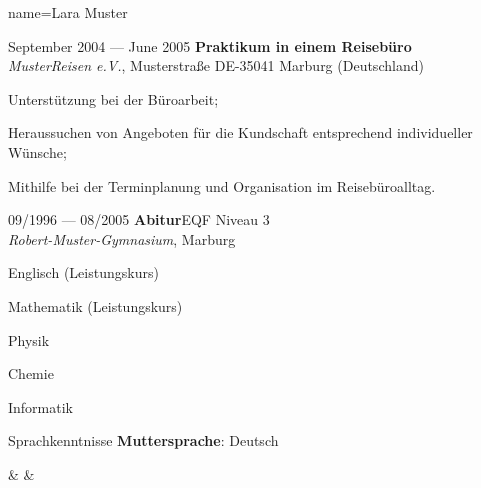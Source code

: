 \documentclass[a4paper, 12pt]{classycv}
\begin{document}
\begin{Resume}{%
	name=Lara Muster%
}
%
\begin{Entry}{%
    \color{accent-color}\selectfont September 2004 --- June 2005%
}{%
    \textbf{Praktikum in einem Reisebüro}\\\textit{MusterReisen e.V.}, Musterstraße DE-35041 Marburg (Deutschland)%
}%
    \begin{List}[skip above=0pt]%
        \item Unterstützung bei der Büroarbeit;
        \item Heraussuchen von Angeboten für die Kundschaft entsprechend individueller Wünsche;
        \item Mithilfe bei der Terminplanung und Organisation im Reisebüroalltag.
    \end{List}
\end{Entry}
\newpage
{}%
%
\begin{Entry}{09/1996 --- 08/2005}{%
    \textbf{Abitur}\hfill EQF Niveau 3\\\textit{Robert-Muster-Gymnasium}, Marburg%
}%
    \begin{List}[skip above=0pt]%
        \item Englisch (Leistungskurs)
        \item Mathematik (Leistungskurs)
        \item Physik
        \item Chemie
        \item Informatik
    \end{List}
\end{Entry}
% 
%
%
\begin{Entry}{Sprachkenntnisse}{}%
    \textbf{Muttersprache}: Deutsch%
    \begin{Table}[column format={%
        C{0.15\linewidth-2\tabcolsep-\arrayrulewidth}%
        *{2}{C{0.15\linewidth-2\tabcolsep-\arrayrulewidth}}%
        *{2}{C{0.15\linewidth-2\tabcolsep-\arrayrulewidth}}%
        C{0.25\linewidth-2\tabcolsep-\arrayrulewidth}}%
        , stretch=1.5%
        , basic style={\lmrfamily\small\color{dark-gray}}]
            & %
            & %

\end{Table}
\end{Entry}
\end{Resume}
\end{document}
